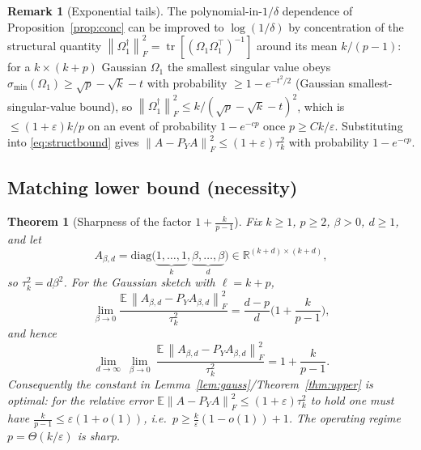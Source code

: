 \documentclass{amsart}
\newtheorem{theorem}{Theorem}
\theoremstyle{definition}
\newtheorem{remark}{Remark}
\DeclareMathOperator{\tr}{tr}
\newcommand{\R}{\mathbb{R}}
\newcommand{\Frob}[1]{\left\lVert #1\right\rVert_F}
\newcommand{\E}{\mathbb{E}}
\begin{document}
\begin{remark}[Exponential tails]\label{rem:exptail}
The polynomial-in-$1/\delta$ dependence of Proposition~\ref{prop:conc} can be
improved to $\log(1/\delta)$ by concentration of the structural quantity
$\Frob{\Omega_1^{\dagger}}^2=\tr[(\Omega_1\Omega_1^\top)^{-1}]$ around its mean
$k/(p-1)$: for a $k\times(k+p)$ Gaussian $\Omega_1$ the smallest singular value
obeys $\sigma_{\min}(\Omega_1)\ge\sqrt{p}-\sqrt{k}-t$ with probability
$\ge1-e^{-t^2/2}$ (Gaussian smallest-singular-value bound), so
$\Frob{\Omega_1^{\dagger}}^2\le k/(\sqrt p-\sqrt k-t)^2$, which is
$\le(1+\varepsilon)k/p$ on an event of probability $1-e^{-cp}$ once
$p\ge Ck/\varepsilon$. Substituting into \eqref{eq:structbound} gives
$\Frob{A-P_YA}^2\le(1+\varepsilon)\tau_k^2$ with probability $1-e^{-cp}$.
\end{remark}

\subsection{Matching lower bound (necessity)}

\begin{theorem}[Sharpness of the factor $1+\tfrac{k}{p-1}$]\label{thm:lower}
Fix $k\ge1$, $p\ge2$, $\beta>0$, $d\ge1$, and let
\[
A_{\beta,d}=\mathrm{diag}\big(\underbrace{1,\dots,1}_{k},
\underbrace{\beta,\dots,\beta}_{d}\big)\in\R^{(k+d)\times(k+d)},
\]
so $\tau_k^2=d\beta^2$. For the Gaussian sketch with $\ell=k+p$,
\begin{equation}\label{eq:limit}
\lim_{\beta\to0}\frac{\E\,\Frob{A_{\beta,d}-P_YA_{\beta,d}}^2}{\tau_k^2}
=\frac{d-p}{d}\Big(1+\frac{k}{p-1}\Big),
\end{equation}
and hence
\begin{equation}\label{eq:limit2}
\lim_{d\to\infty}\ \lim_{\beta\to0}\
\frac{\E\,\Frob{A_{\beta,d}-P_YA_{\beta,d}}^2}{\tau_k^2}
=1+\frac{k}{p-1}.
\end{equation}
Consequently the constant in Lemma~\ref{lem:gauss}/Theorem~\ref{thm:upper} is
optimal: for the relative error $\E\Frob{A-P_YA}^2\le(1+\varepsilon)\tau_k^2$ to
hold one must have $\frac{k}{p-1}\le\varepsilon(1+o(1))$, i.e.\
$p\ge\frac{k}{\varepsilon}(1-o(1))+1$. The operating regime
$p=\Theta(k/\varepsilon)$ is sharp.
\end{theorem}
\end{document}
